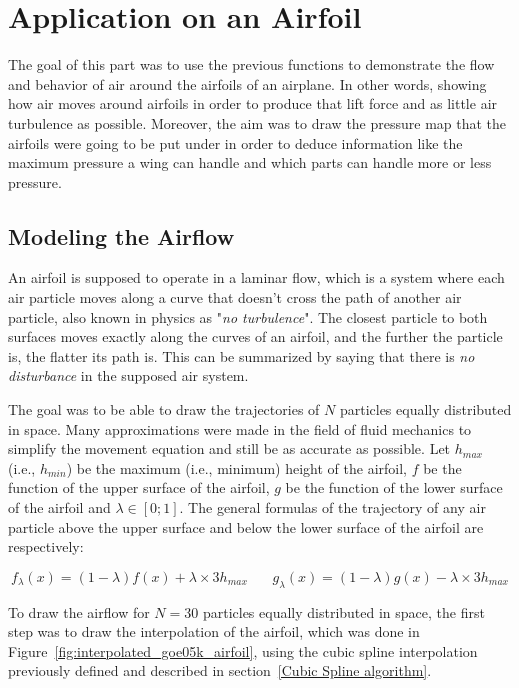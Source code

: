 \section{Application on an Airfoil}

The goal of this part was to use the previous functions to demonstrate the flow and behavior of
air around the airfoils of an airplane. In other words, showing how air moves around airfoils in order to produce that
lift force and as little air turbulence as possible. Moreover, the aim was to draw the pressure map that
the airfoils were going to be put under in order to deduce information like the maximum pressure
a wing can handle and which parts can handle more or less pressure.

\subsection{Modeling the Airflow }

An airfoil is supposed to operate in a laminar flow, which is a system where each air particle
moves along a curve that doesn't cross the path of another air particle, also known in physics 
as "\emph{no turbulence}". The closest particle to both surfaces moves exactly along the curves of an airfoil,
and the further the particle is, the flatter its path is. This can be summarized by saying that there is
\emph{no disturbance} in the supposed air system.


The goal was to be able to draw the trajectories of $N$ particles equally distributed in space. Many 
approximations were made in the field of fluid mechanics to simplify the movement equation and still 
be as accurate as possible. Let $h_{max}$ (i.e., $h_{min}$) be the maximum (i.e., minimum) height of the airfoil, 
$f$ be the function of the upper surface of the airfoil, $g$ be the function of the lower surface of the 
airfoil and $\lambda \in [0;1]$. The general formulas of the trajectory of any air particle above the upper 
surface and below the lower surface of the airfoil are respectively:

\begin{equation}
    \label{eq:airflow_up_low}
    f_\lambda(x) = (1-\lambda)f(x)+\lambda \times 3h_{max}\ \ \ \ \ \ \ \ 
    g_\lambda(x) = (1-\lambda)g(x)-\lambda \times 3h_{max}
\end{equation}

To draw the airflow for $N=30$ particles equally distributed in space, the first step was to draw the interpolation
of the airfoil, which was done in Figure~\ref{fig:interpolated_goe05k_airfoil}, using the cubic spline interpolation
 previously defined and described in section~\ref{Cubic Spline algorithm}.

